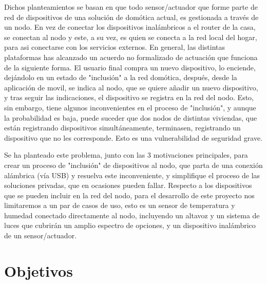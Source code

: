 Dichos planteamientos se basan en que todo sensor/actuador que forme parte de red de dispositivos de una solución de domótica actual, es gestionada a través de un nodo. En vez de conectar los dispositivos inalámbricos a el router de la casa, se conectan al nodo y este, a su vez, es quien se conecta a la red local del hogar, para asi conectarse con los servicios externos. En general, las distintas plataformas has alcanzado un acuerdo no formalizado de actuación que funciona de la siguiente forma. El usuario final compra un nuevo dispositivo, lo enciende, dejándolo en un estado de "inclusión" a la red domótica, después, desde la aplicación de movil, se indica al nodo, que se quiere añadir un nuevo dispositivo, y tras seguir las indicaciones, el dispositivo se registra en la red del nodo. Esto, sin embargo, tiene algunos inconvenientes en el proceso de "inclusión", y aunque la probabilidad es baja, puede suceder que dos nodos de distintas viviendas, que están registrando dispositivos simultáneamente, terminasen, registrando un dispositivo que no les corresponde. Esto es una vulnerabilidad de seguridad grave.

Se ha planteado este problema, junto con las 3 motivaciones principales, para crear un proceso de "inclusión" de dispositivos al nodo, que parta de una conexión alámbrica (vía USB) y resuelva este inconveniente, y simplifique el proceso de las soluciones privadas, que en ocasiones pueden fallar. Respecto a los dispositivos que se pueden incluir en la red del nodo, para el desarrollo de este proyecto nos limitaremos a un par de casos de uso, esto es un sensor de temperatura y humedad conectado directamente al nodo, incluyendo un altavoz y un sistema de luces que cubrirán un amplio espectro de opciones, y un dispositivo inalámbrico de un sensor/actuador.


\section{Objetivos}
\label{ch:Capitulo1.2}

